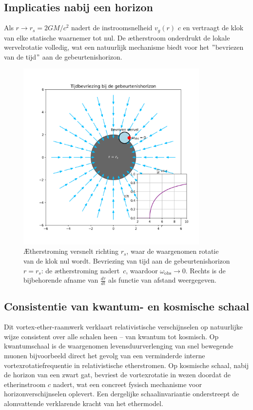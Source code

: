 \subsection*{Implicaties nabij een horizon}

Als $r \to r_s = 2GM/c^2$ nadert de instroomsnelheid $v_g(r)$ $c$ en vertraagt de klok van elke statische waarnemer tot nul. De ætherstroom onderdrukt de lokale wervelrotatie volledig, wat een natuurlijk mechanisme biedt voor het \("\)bevriezen van de tijd\("\) aan de gebeurtenishorizon.


\begin{figure}[htbp]
    \centering
    \includegraphics[width=0.85\textwidth]{10-HorizonTijdsbevriezing_nl}
    \caption{Ætherstroming versnelt richting $r_s$, waar de waargenomen rotatie van de klok nul wordt. Bevriezing van tijd aan de gebeurtenishorizon $r = r_s$: de ætherstroming nadert~$c$, waardoor $\omega_{\mathrm{obs}} \to 0$. Rechts is de bijbehorende afname van $\frac{d\tau}{dt}$ als functie van afstand weergegeven.}
    \label{fig:HorizonTijdsbevriezing}
\end{figure}

\subsection*{Consistentie van kwantum- en kosmische schaal}

Dit vortex-ether-raamwerk verklaart relativistische verschijnselen op natuurlijke wijze consistent over alle schalen heen – van kwantum tot kosmisch. Op kwantumschaal is de waargenomen levensduurverlenging van snel bewegende muonen bijvoorbeeld direct het gevolg van een verminderde interne vortexrotatiefrequentie in relativistische etherstromen. Op kosmische schaal, nabij de horizon van een zwart gat, bevriest de vortexrotatie in wezen doordat de etherinstroom $c$ nadert, wat een concreet fysisch mechanisme voor horizonverschijnselen oplevert. Een dergelijke schaalinvariantie onderstreept de alomvattende verklarende kracht van het ethermodel.

